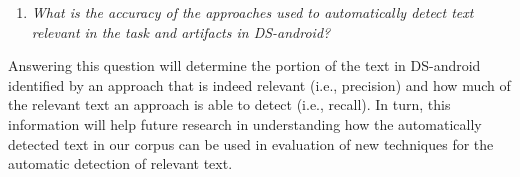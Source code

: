 \begin{enumerate}[label={},leftmargin=0.7cm]
\item \textit{What is the accuracy of the approaches used to automatically detect text relevant in the task and artifacts in \acs{DS-android}?} 

\end{enumerate}


Answering this question will determine the portion of the text in \acs{DS-android} identified by an approach that 
is indeed relevant (i.e., precision) and how much 
of the relevant text an approach is able to detect (i.e., recall).
In turn, this information will help future research in understanding
how the automatically detected text in our corpus can be used in evaluation of new techniques for the automatic detection of relevant text. 
























% 

% 







